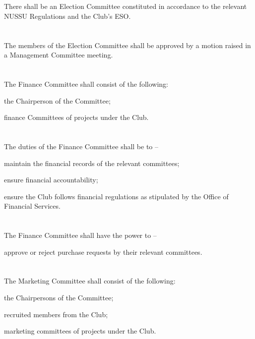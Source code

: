 
\section{}
There shall be an Election Committee constituted in accordance to the relevant NUSSU Regulations and the Club's ESO.

\section{}
The members of the Election Committee shall be approved by a motion raised in a Management Committee meeting.

\section{}
The Finance Committee shall consist of the following:
	\begin{legal}
	\item the Chairperson of the Committee;
	\item finance Committees of projects under the Club.
	\end{legal}

\section{}
The duties of the Finance Committee shall be to –
	\begin{legal}
	\item maintain the financial records of the relevant committees;
	\item ensure financial accountability;
	\item ensure the Club follows financial regulations as stipulated by the Office of Financial Services.
	\end{legal}

\section{}
The Finance Committee shall have the power to –
	\begin{legal}
	\item approve or reject purchase requests by their relevant committees.
	\end{legal}

\section{}
The Marketing Committee shall consist of the following:
	\begin{legal}
	\item the Chairpersons of the Committee;
	\item recruited members from the Club;
	\item marketing committees of projects under the Club.
	\end{legal}

